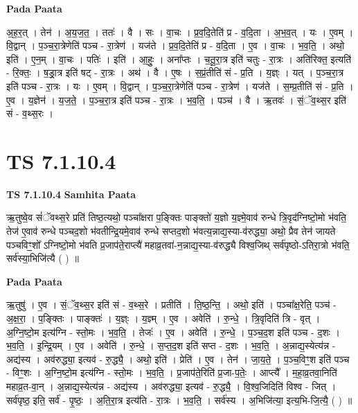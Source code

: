 \documentclass[17pt]{extarticle}
\begin{document}
\textbf{Pada Paata} \newline

अ॒ह॒र॒त् । तेन॑ । अ॒य॒ज॒त॒ । ततः॑ । वै । सः । वा॒चः । प्र॒व॒दि॒तेति॑ प्र - व॒दि॒ता । अ॒भ॒व॒त् । यः । ए॒वम् । वि॒द्वान् । प॒ञ्च॒रा॒त्रेणेति॑ पञ्च - रा॒त्रेण॑ । यज॑ते । प्र॒व॒दि॒तेति॑ प्र - व॒दि॒ता । ए॒व । वा॒चः । भ॒व॒ति॒ । अथो॒ इति॑ । ए॒न॒म् । वा॒चः । पतिः॑ । इति॑ । आ॒हुः॒ । अना᳚प्तः । च॒तू॒रा॒त्र इति॑ चतुः - रा॒त्रः । अति॑रिक्त॒ इत्यति॑ - रि॒क्तः॒ । ष॒ड्रा॒त्र इति॑ षट् - रा॒त्रः । अथ॑ । वै । ए॒षः । स॒प्रं॒तीति॑ सं - प्र॒ति । य॒ज्ञ्ः । यत् । प॒ञ्च॒रा॒त्र इति॑ पञ्च - रा॒त्रः । यः । ए॒वम् । वि॒द्वान् । प॒ञ्च॒रा॒त्रेणेति॑ पञ्च - रा॒त्रेण॑ । यज॑ते । स॒म्प्र॒तीति॑ सं - प्र॒ति । ए॒व । य॒ज्ञेन॑ । य॒ज॒ते॒ । प॒ञ्च॒रा॒त्र इति॑ पञ्च - रा॒त्रः । भ॒व॒ति॒ । पञ्च॑ । वै । ऋ॒तवः॑ । सं॒ॅव॒थ्स॒र इति॑ सं - व॒थ्स॒रः ।  \newline




\section*{ TS 7.1.10.4 }

\textbf{TS 7.1.10.4 } \newline
\textbf{Samhita Paata} \newline

ऋ॒तुष्वे॒व सं॑ॅवथ्स॒रे प्रति॑ तिष्ठ॒त्यथो॒ पञ्चा᳚क्षरा प॒ङ्क्तिः पाङ्क्तो॑ य॒ज्ञो य॒ज्ञ्मे॒वाव॑ रुन्धे त्रि॒वृद॑ग्निष्टो॒मो भ॑वति॒ तेज॑ ए॒वाव॑ रुन्धे पञ्चद॒शो भ॑वतीन्द्रि॒यमे॒वाव॑ रुन्धे सप्तद॒शो भ॑वत्य॒न्नाद्य॒स्या-व॑रुद्ध्या॒ अथो॒ प्रैव तेन॑ जायते पञ्चविꣳ॒॒शो᳚ ऽग्निष्टो॒मो भ॑वति प्र॒जाप॑ते॒राप्त्यै॑ महाव्र॒तवा॑-न॒न्नाद्य॒स्या-व॑रुद्ध्यै विश्व॒जिथ् सर्व॑पृष्ठो-ऽतिरा॒त्रो भ॑वति॒ सर्व॑स्या॒भिजि॑त्यै ( ) ॥ \newline

\textbf{Pada Paata} \newline

ऋ॒तुषु॑ । ए॒व । सं॒ॅव॒थ्स॒र इति॑ सं - व॒थ्स॒रे । प्रतीति॑ । ति॒ष्ठ॒न्ति॒ । अथो॒ इति॑ । पञ्चा᳚क्ष॒रेति॒ पञ्च॑ - अ॒क्ष॒रा॒ । प॒ङ्क्तिः । पाङ्क्तः॑ । य॒ज्ञ्ः । य॒ज्ञ्म् । ए॒व । अवेति॑ । रु॒न्धे॒ । त्रि॒वृदिति॑ त्रि - वृत् । अ॒ग्नि॒ष्टो॒म इत्य॑ग्नि - स्तो॒मः । भ॒व॒ति॒ । तेजः॑ । ए॒व । अवेति॑ । रु॒न्धे॒ । प॒ञ्च॒द॒श इति॑ पञ्च - द॒शः । भ॒व॒ति॒ । इ॒न्द्रि॒यम् । ए॒व । अवेति॑ । रु॒न्धे॒ । स॒प्त॒द॒श इति॑ सप्त - द॒शः । भ॒व॒ति॒ । अ॒न्नाद्य॒स्येत्य॑न्न - अद्य॑स्य । अव॑रुद्ध्या॒ इत्यव॑ - रु॒द्ध्यै॒ । अथो॒ इति॑ । प्रेति॑ । ए॒व । तेन॑ । जा॒य॒ते॒ । प॒ञ्च॒विꣳ॒॒श इति॑ पञ्च - विꣳ॒॒शः । अ॒ग्नि॒ष्टो॒म इत्य॑ग्नि - स्तो॒मः । भ॒व॒ति॒ । प्र॒जाप॑ते॒रिति॑ प्र॒जा-प॒तेः॒ । आप्त्यै᳚ । म॒हा॒व्र॒तवा॒निति॑ महाव्र॒त-वा॒न् । अ॒न्नाद्य॒स्येत्य॑न्न - अद्य॑स्य । अव॑रुद्ध्या॒ इत्यव॑ - रु॒द्ध्यै॒ । वि॒श्व॒जिदिति॑ विश्व - जित् । सर्व॑पृष्ठ॒ इति॒ सर्व॑ - पृ॒ष्ठः॒ । अ॒ति॒रा॒त्र इत्य॑ति - रा॒त्रः । भ॒व॒ति॒ । सर्व॑स्य । अ॒भिजि॑त्या॒ इत्य॒भि-जि॒त्यै॒ ( ) ॥  \newline
\end{document}

